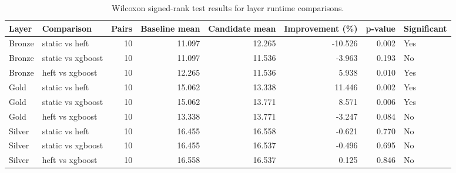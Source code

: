 \begin{table}
\caption{Wilcoxon signed-rank test results for layer runtime comparisons.}
\label{tab:wilcoxon-runtime}
\begin{tabular}{llrrrrrl}
\toprule
Layer & Comparison & Pairs & Baseline mean & Candidate mean & Improvement (\%) & p-value & Significant \\
\midrule
Bronze & static vs heft & 10 & 11.097 & 12.265 & -10.526 & 0.002 & Yes \\
Bronze & static vs xgboost & 10 & 11.097 & 11.536 & -3.963 & 0.193 & No \\
Bronze & heft vs xgboost & 10 & 12.265 & 11.536 & 5.938 & 0.010 & Yes \\
Gold & static vs heft & 10 & 15.062 & 13.338 & 11.446 & 0.002 & Yes \\
Gold & static vs xgboost & 10 & 15.062 & 13.771 & 8.571 & 0.006 & Yes \\
Gold & heft vs xgboost & 10 & 13.338 & 13.771 & -3.247 & 0.084 & No \\
Silver & static vs heft & 10 & 16.455 & 16.558 & -0.621 & 0.770 & No \\
Silver & static vs xgboost & 10 & 16.455 & 16.537 & -0.496 & 0.695 & No \\
Silver & heft vs xgboost & 10 & 16.558 & 16.537 & 0.125 & 0.846 & No \\
\bottomrule
\end{tabular}
\end{table}
